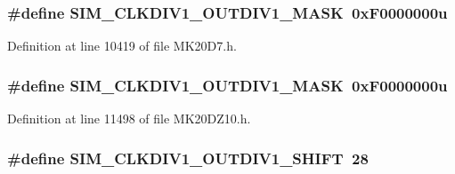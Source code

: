 \subsubsection[{\texorpdfstring{S\+I\+M\+\_\+\+C\+L\+K\+D\+I\+V1\+\_\+\+O\+U\+T\+D\+I\+V1\+\_\+\+M\+A\+SK}{SIM_CLKDIV1_OUTDIV1_MASK}}]{\setlength{\rightskip}{0pt plus 5cm}\#define S\+I\+M\+\_\+\+C\+L\+K\+D\+I\+V1\+\_\+\+O\+U\+T\+D\+I\+V1\+\_\+\+M\+A\+SK~0x\+F0000000u}\hypertarget{group___s_i_m___register___masks_ga1bd42e75000e91999a7d8c2f94a9b606}{}\label{group___s_i_m___register___masks_ga1bd42e75000e91999a7d8c2f94a9b606}


Definition at line 10419 of file M\+K20\+D7.\+h.

\subsubsection[{\texorpdfstring{S\+I\+M\+\_\+\+C\+L\+K\+D\+I\+V1\+\_\+\+O\+U\+T\+D\+I\+V1\+\_\+\+M\+A\+SK}{SIM_CLKDIV1_OUTDIV1_MASK}}]{\setlength{\rightskip}{0pt plus 5cm}\#define S\+I\+M\+\_\+\+C\+L\+K\+D\+I\+V1\+\_\+\+O\+U\+T\+D\+I\+V1\+\_\+\+M\+A\+SK~0x\+F0000000u}\hypertarget{group___s_i_m___register___masks_ga1bd42e75000e91999a7d8c2f94a9b606}{}\label{group___s_i_m___register___masks_ga1bd42e75000e91999a7d8c2f94a9b606}


Definition at line 11498 of file M\+K20\+D\+Z10.\+h.

\subsubsection[{\texorpdfstring{S\+I\+M\+\_\+\+C\+L\+K\+D\+I\+V1\+\_\+\+O\+U\+T\+D\+I\+V1\+\_\+\+S\+H\+I\+FT}{SIM_CLKDIV1_OUTDIV1_SHIFT}}]{\setlength{\rightskip}{0pt plus 5cm}\#define S\+I\+M\+\_\+\+C\+L\+K\+D\+I\+V1\+\_\+\+O\+U\+T\+D\+I\+V1\+\_\+\+S\+H\+I\+FT~28}\hypertarget{group___s_i_m___register___masks_ga2d45b701595bf4f2bc6a451508f94c25}{}\label{group___s_i_m___register___masks_ga2d45b701595bf4f2bc6a451508f94c25}


